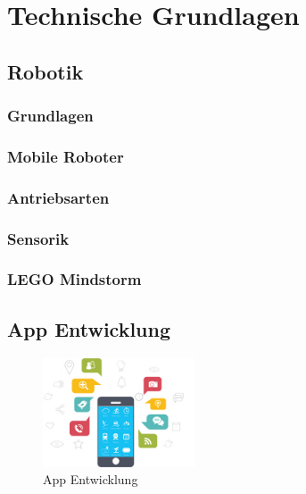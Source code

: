 \section{Technische Grundlagen}
\subsection{Robotik} %

\subsubsection{Grundlagen}
\subsubsection{Mobile Roboter}
\subsubsection{Antriebsarten}
\subsubsection{Sensorik}
\subsubsection{LEGO Mindstorm}

\newpage
\subsection{App Entwicklung} %

\begin{figure}
	\begin{center}
		\includegraphics[width=0.4\textwidth]{images/technische_grundlagen/App-Development.jpg}
	\end{center}
	\caption{App Entwicklung}
	\label{fig:appentwicklung}
\end{figure}

